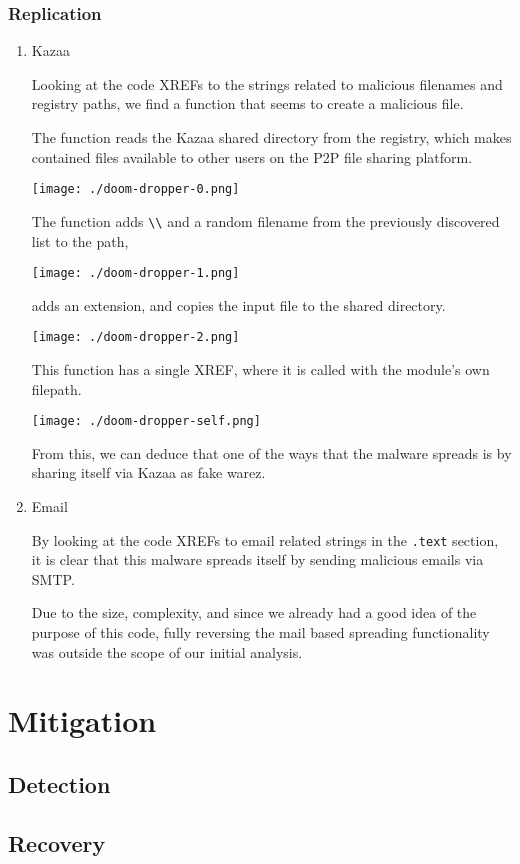 \documentclass[11pt]{article}
\begin{document}
\subsubsection{Replication}
\label{sec:org1b6103f}
\begin{enumerate}
\item Kazaa
\label{sec:orgafad343}

Looking at the code XREFs to the strings related to malicious
filenames and registry paths, we find a function that seems to create
a malicious file.

The function reads the Kazaa shared directory from the registry, which
makes contained files available to other users on the P2P file sharing
platform.

\begin{center}
\texttt{[image: ./doom-dropper-0.png]}
\end{center}

The function adds \texttt{\textbackslash{}\textbackslash{}} and a random filename from the previously
discovered list to the path,

\begin{center}
\texttt{[image: ./doom-dropper-1.png]}
\end{center}

adds an extension, and copies the input file to the shared directory.

\begin{center}
\texttt{[image: ./doom-dropper-2.png]}
\end{center}

This function has a single XREF, where it is called with the module's
own filepath.

\begin{center}
\texttt{[image: ./doom-dropper-self.png]}
\end{center}

From this, we can deduce that one of the ways that the malware spreads
is by sharing itself via Kazaa as fake warez.
\item Email
\label{sec:orge96d63a}

By looking at the code XREFs to email related strings in the \texttt{.text}
section, it is clear that this malware spreads itself by sending
malicious emails via SMTP.

Due to the size, complexity, and since we already had a good idea of
the purpose of this code, fully reversing the mail based spreading
functionality was outside the scope of our initial analysis.
\end{enumerate}
\section{Mitigation}
\label{sec:org1d10b52}
\subsection{Detection}
\label{sec:org516e214}
\subsection{Recovery}
\label{sec:org46ab20e}
\end{document}

